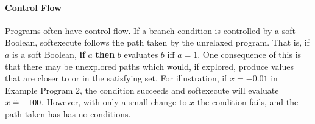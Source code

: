 \paragraph{Control Flow}
Programs often have control flow.
If a branch condition is controlled by a soft Boolean, softexecute follows the path taken by the unrelaxed program.  That is, if $a$ is a soft Boolean, \textbf{if} $a$ \textbf{then} $b$ evaluates $b$ iff $a = 1$.
One consequence of this is that there may be unexplored paths which would, if explored, produce values that are closer to or in the satisfying set.
For illustration, if $x = -0.01$ in Example Program 2,
 the condition succeeds and \textrm{softexecute} will evaluate $x \mathrel{\tilde{=}} -100$. However, with only a small change to $x$ the condition fails, and the path taken has has no conditions.







